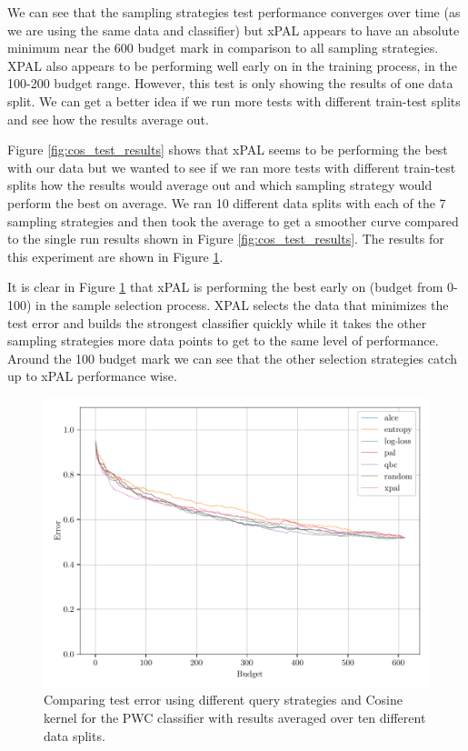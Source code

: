 We can see that the sampling strategies test performance converges over time (as we are using the same data and classifier) but xPAL appears to have an absolute minimum near the 600 budget mark in comparison to all sampling strategies. XPAL also appears to be performing well early on in the training process, in the 100-200 budget range. However, this test is only showing the results of one data split. We can get a better idea if we run more tests with different train-test splits and see how the results average out.

Figure \ref{fig:cos_test_results} shows that xPAL seems to be performing the best with our data but we wanted to see if we ran more tests with different train-test splits how the results would average out and which sampling strategy would perform the best on average. We ran 10 different data splits with each of the 7 sampling strategies and then took the average to get a smoother curve compared to the single run results shown in Figure \ref*{fig:cos_test_results}. The results for this experiment are shown in Figure \ref{fig:cos_avg_test_results}. 

It is clear in Figure \ref{fig:cos_avg_test_results} that xPAL is performing the best early on (budget from 0-100) in the sample selection process. XPAL selects the data that minimizes the test error and builds the strongest classifier quickly while it takes the other sampling strategies more data points to get to the same level of performance. Around the 100 budget mark we can see that the other selection strategies catch up to xPAL performance wise.

\begin{figure}[ht]
    \centering
    \includegraphics[width=\scale\textwidth]{../img/plot_kernel_cos_averaged_test_results.pdf}
    \caption{Comparing test error using different query strategies and Cosine kernel for the PWC classifier with results averaged over ten different data splits.}
    \label{fig:cos_avg_test_results}
\end{figure}



